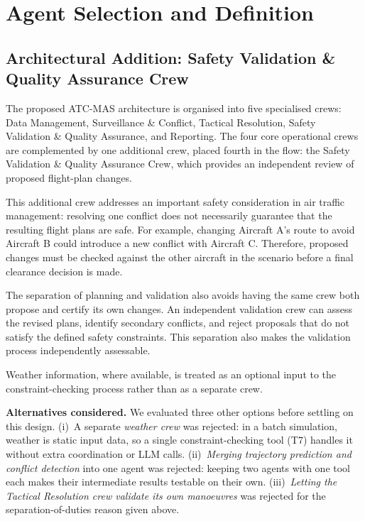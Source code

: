 \section{Agent Selection and Definition}\label{sec:agents}

\subsection{Architectural Addition: Safety Validation \& Quality Assurance Crew}

The proposed ATC-MAS architecture is organised into five specialised crews: Data Management, Surveillance \& Conflict, Tactical Resolution, Safety Validation \& Quality Assurance, and Reporting. The four core operational crews are complemented by one additional crew, placed fourth in the flow: the Safety Validation \& Quality Assurance Crew, which provides an independent review of proposed flight-plan changes.

This additional crew addresses an important safety consideration in air traffic management: resolving one conflict does not necessarily guarantee that the resulting flight plans are safe. For example, changing Aircraft A's route to avoid Aircraft B could introduce a new conflict with Aircraft C. Therefore, proposed changes must be checked against the other aircraft in the scenario before a final clearance decision is made.

The separation of planning and validation also avoids having the same crew both propose and certify its own changes. An independent validation crew can assess the revised plans, identify secondary conflicts, and reject proposals that do not satisfy the defined safety constraints. This separation also makes the validation process independently assessable.

Weather information, where available, is treated as an optional input to the constraint-checking process rather than as a separate crew.

\textbf{Alternatives considered.} We evaluated three other options before settling on this design. (i)~A separate \emph{weather crew} was rejected: in a batch simulation, weather is static input data, so a single constraint-checking tool (T7) handles it without extra coordination or LLM calls. (ii)~\emph{Merging trajectory prediction and conflict detection} into one agent was rejected: keeping two agents with one tool each makes their intermediate results testable on their own. (iii)~\emph{Letting the Tactical Resolution crew validate its own manoeuvres} was rejected for the separation-of-duties reason given above.

